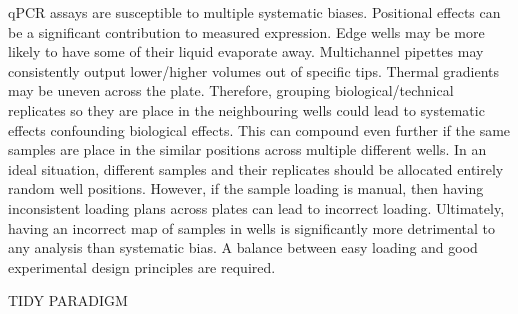 \documentclass{SBCbookchapter}
\begin{document}
qPCR assays are susceptible to multiple systematic biases. Positional effects can be a significant contribution to measured expression. Edge wells may be more likely to have some of their liquid evaporate away. Multichannel pipettes may consistently output lower/higher volumes out of specific tips. Thermal gradients may be uneven across the plate. Therefore, grouping biological/technical replicates so they are place in the neighbouring wells could lead to systematic effects confounding biological effects. This can compound even further if the same samples are place in the similar positions across multiple different wells. In an ideal situation, different samples and their replicates should be allocated entirely random well positions. However, if the sample loading is manual, then having inconsistent loading plans across plates can lead to incorrect loading. Ultimately, having an incorrect map of samples in wells is significantly more detrimental to any analysis than systematic bias. A balance between easy loading and good experimental design principles are required.

TIDY PARADIGM
\end{document}
